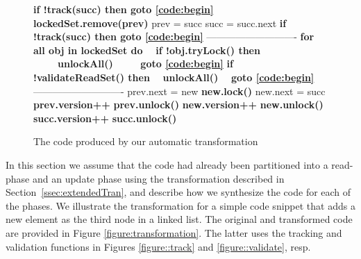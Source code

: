 \begin{figure*}
\begin{center}
\begin{subfigure}[t]{.45\textwidth}
\begin{algorithmic}[1]{}
{			\State{\spOne}\textbf{if !track(succ) then {goto} \ref{code:begin}}  \label{code:readGhaseGoto2}
			\State{\spOne}\textbf{lockedSet.remove(prev)} \label{code:lockedSet:remove2}
			\State{\spOne}prev = succ
			\State{\spOne}succ = succ.next
			\State{\spZero}\textbf{if !track(succ) then {goto} \ref{code:begin}} \label{code:readGhaseGoto3}
			\Statex ----------------------------
			\State{\spZero}\textbf{for all obj in lockedSet do} \label{code:validateLockedSet}	
            \State{\spZero}\ \ \textbf{if !obj.tryLock() then}
            \State{\spZero}\ \ \ \ \ \textbf{unlockAll()}
            \State{\spZero}\ \ \ \ \ \textbf{{goto} \ref{code:begin}} \label{code:validateGoto1}
			\State{\spZero}\textbf{if !validateReadSet() then} 		\label{code:validateReadSet}
				\State{\spZero}\ \ \textbf{unlockAll()}
				\State{\spZero}\ \ \textbf{{goto} \ref{code:begin}} \label{code:validateGoto2}
			\Statex ----------------------------
			\State{\spZero}prev.next = new
			\State{\spZero}\textbf{new.lock()}
			\State{\spZero}new.next = succ			
			\State{\spZero}\textbf{prev.version++}
			\State{\spZero}\textbf{prev.unlock()}
			\State{\spZero}\textbf{new.version++}
			\State{\spZero}\textbf{new.unlock()}
			\State{\spZero}\textbf{succ.version++}
			\State{\spZero}\textbf{succ.unlock()}

			\EndFunction
			}
		\end{algorithmic}
		\caption{The code produced by our automatic transformation}\label{figure:transformation:after}
	\end{subfigure}
	\end{center}
\vspace{-4mm}
	\caption{Code example.
	The synchronization code is in bold.
			\label{figure:transformation}}
\end{figure*}

In this section we assume that the code had already been partitioned into a read-phase and an update phase using 
the transformation described in Section~\ref{ssec:extendedTran}, and 
describe how we synthesize the code for each of the phases.
We illustrate the transformation for a simple code snippet that adds a new element as the third node in a linked list.
The original and transformed code are provided in Figure \ref{figure:transformation}. The latter uses
the tracking and validation functions in Figures \ref{figure::track} and
\ref{figure::validate}, resp.

